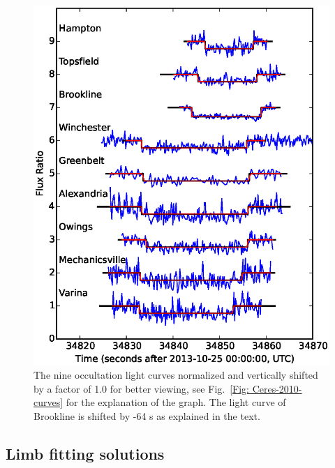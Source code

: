 \documentclass[useAMS,usenatbib]{mn2e}
\begin{document}
\begin{figure}
\includegraphics[scale=0.58]{figures/Ceres_2013_fluxratio.eps} 
\caption{The nine occultation light curves normalized and vertically shifted by a factor of 1.0 for better viewing, see Fig.~\ref{Fig: Ceres-2010-curves} for the explanation of the graph.%
The light curve of Brookline is shifted by -64 s as explained in the text. \label{Fig: Ceres-2013-curves}}
\end{figure}




\subsection{Limb fitting solutions}
\end{document}
